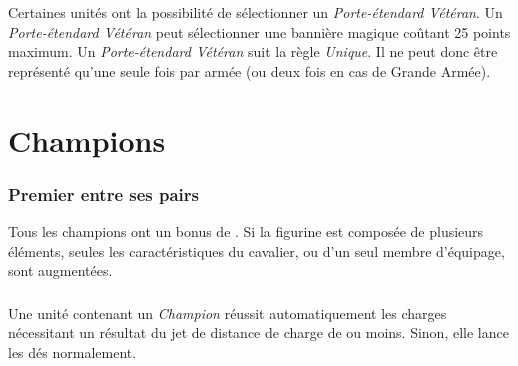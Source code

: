 Certaines unités ont la possibilité de sélectionner un \emph{Porte-étendard Vétéran}. Un \emph{Porte-étendard Vétéran} peut sélectionner une bannière magique coûtant 25 points maximum. Un \emph{Porte-étendard Vétéran} suit la règle \emph{Unique}. Il ne peut donc être représenté qu'une seule fois par armée (ou deux fois en cas de Grande Armée).

\section{Champions}

\subsubsection*{Premier entre ses pairs}

Tous les champions ont un bonus de . Si la figurine est composée de plusieurs éléments, seules les caractéristiques du cavalier, ou d'un seul membre d'équipage, sont augmentées.

\subsubsection*{}

Une unité contenant un \emph{Champion} réussit automatiquement les charges nécessitant un résultat du jet de distance de charge de  ou moins. Sinon, elle lance les dés normalement.

